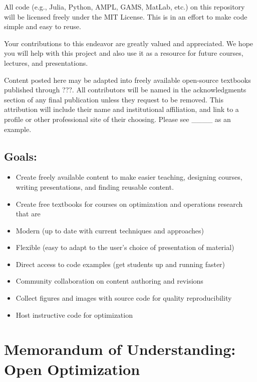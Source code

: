 All code (e.g., Julia, Python, AMPL, GAMS, MatLab, etc.) on this
repository will be licensed freely under the MIT License. This is in an
effort to make code simple and easy to reuse.

Your contributions to this endeavor are greatly valued and appreciated.
We hope you will help with this project and also use it as a resource
for future courses, lectures, and presentations.

Content posted here may be adapted into freely available open-source
textbooks published through ???. All contributors will be named in the
acknowledgments section of any final publication unless they request to
be removed. This attribution will include their name and institutional
affiliation, and link to a profile or other professional site of their
choosing. Please see \_\_\_\_ as an example.

\hypertarget{goals}{%
\subsection{Goals:}\label{goals}}

\begin{itemize}
\tightlist
\item
  Create freely available content to make easier teaching, designing
  courses, writing presentations, and finding reusable content.
\item
  Create free textbooks for courses on optimization and operations
  research that are
\item
  Modern (up to date with current techniques and approaches)
\item
  Flexible (easy to adapt to the user's choice of presentation of
  material)
\item
  Direct access to code examples (get students up and running faster)
\item
  Community collaboration on content authoring and revisions
\item
  Collect figures and images with source code for quality
  reproducibility
\item
  Host instructive code for optimization
\end{itemize}

\hypertarget{memorandum-of-understanding-open-optimization}{%
\section{Memorandum of Understanding: Open
Optimization}\label{memorandum-of-understanding-open-optimization}}

